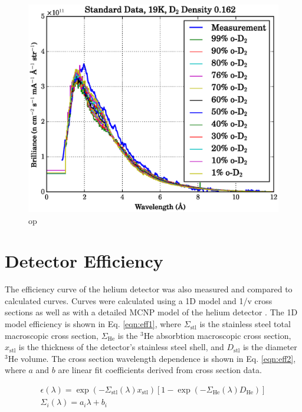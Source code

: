 \documentclass[preprint,12pt]{elsarticle}
\begin{document}
\begin{figure}[h!] 
  \centering
    \includegraphics[width=\columnwidth]{graphics/op_compare.eps}
     \caption{op \label{fig:op_compare}}
\end{figure}

\section{Detector Efficiency}
\label{sec:eff}

The efficiency curve of the helium detector was also measured and compared to calculated curves.  Curves were calculated using a 1D model and 1/v cross sections as well as with a detailed MCNP model of the helium detector \cite{bonner_manual}.  The 1D model efficiency is shown in Eq. \ref{eqn:eff1}, where $\Sigma_{\textrm{stl}}$ is the stainless steel total macroscopic cross section, $\Sigma_{\textrm{He}}$ is the $^3$He absorbtion macroscopic cross section, $x_{\textrm{stl}}$ is the thickness of the detector's stainless steel shell, and  $D_{\textrm{stl}}$ is the diameter $^3$He volume.  The cross section wavelength dependence is shown in Eq. \ref{eqn:eff2}, where $a$ and $b$ are linear fit coefficients derived from cross section data.  

\begin{gather}
     \label{eqn:eff1} \epsilon(\lambda) = \exp \left(-\Sigma_{\textrm{stl}}(\lambda) x_{\textrm{stl}}\right)[1-\exp(-\Sigma_{\textrm{He}}(\lambda) D_{\textrm{He}})] \\
     \label{eqn:eff2} \Sigma_i(\lambda) = a_i\lambda+b_i
\end{gather}
\end{document}
